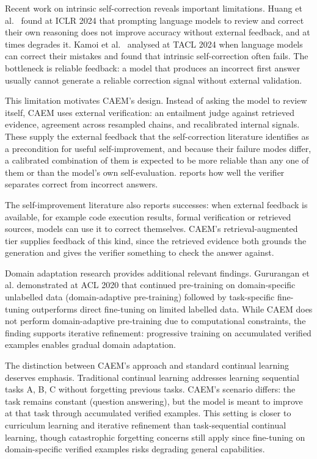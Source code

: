 Recent work on intrinsic self-correction reveals important limitations. Huang et al.\ \cite{huang2024cannot} found at ICLR 2024 that prompting language models to review and correct their own reasoning does not improve accuracy without external feedback, and at times degrades it. Kamoi et al.\ \cite{kamoi-etal-2024-llms} analysed at TACL 2024 when language models can correct their mistakes and found that intrinsic self-correction often fails. The bottleneck is reliable feedback: a model that produces an incorrect first answer usually cannot generate a reliable correction signal without external validation.

This limitation motivates CAEM's design. Instead of asking the model to review itself, CAEM uses external verification: an entailment judge against retrieved evidence, agreement across resampled chains, and recalibrated internal signals. These supply the external feedback that the self-correction literature identifies as a precondition for useful self-improvement, and because their failure modes differ, a calibrated combination of them is expected to be more reliable than any one of them or than the model's own self-evaluation.  reports how well the verifier separates correct from incorrect answers.

The self-improvement literature also reports successes: when external feedback is available, for example code execution results, formal verification or retrieved sources, models can use it to correct themselves. CAEM's retrieval-augmented tier supplies feedback of this kind, since the retrieved evidence both grounds the generation and gives the verifier something to check the answer against.

Domain adaptation research provides additional relevant findings. Gururangan et al. \cite{gururangan-etal-2020-dont} demonstrated at ACL 2020 that continued pre-training on domain-specific unlabelled data (domain-adaptive pre-training) followed by task-specific fine-tuning outperforms direct fine-tuning on limited labelled data. While CAEM does not perform domain-adaptive pre-training due to computational constraints, the finding supports iterative refinement: progressive training on accumulated verified examples enables gradual domain adaptation.

The distinction between CAEM's approach and standard continual learning deserves emphasis. Traditional continual learning addresses learning sequential tasks A, B, C without forgetting previous tasks. CAEM's scenario differs: the task remains constant (question answering), but the model is meant to improve at that task through accumulated verified examples. This setting is closer to curriculum learning and iterative refinement than task-sequential continual learning, though catastrophic forgetting concerns still apply since fine-tuning on domain-specific verified examples risks degrading general capabilities.

